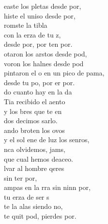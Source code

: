 \begin{cancion}%
	easte los pletas desde  por,\\
	histe el uniso desde  por,\\
	romste la tibla \\
	con la erza de tu z,\\
	desde  por, por ten por.\\
	otaron los arstos desde  pod,\\
	voron los halnes desde pod\\
	pintaron el o en un pico de pama,\\
	desde tu po, por er por.\\
	do cuanto hay en la da\\
	Tia recibido el aento\\
	y los bres que te en\\
	dos decimos sarlo.  \\
	ando broten los ovos\\
	y el sol ene de luz los senros,\\
	nca olvidemos, jams,\\
	que cual  hemos deaceo.\\
	lvar al hombre qeres \\
	sin ter por,\\
	ampas en la rra sin ninn por, \\
	tu erza de ser s\\
	te la alas siendo no, \\
	te quit pod, pierdes  por.\\

\end{cancion}
